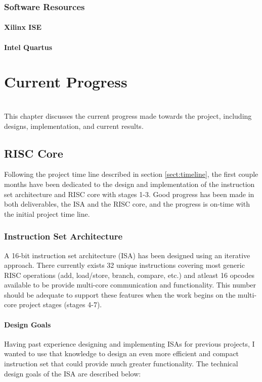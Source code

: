 \documentclass[11pt,a4paper]{report}
\begin{document}
{\subsection{Software Resources}
\subsubsection{Xilinx ISE}
\subsubsection{Intel Quartus}

\chapter{Current Progress}
{%
\startcontents[chapters]
}
\noindent\\
This chapter discusses the current progress made towards the project, including designs, implementation, and current results.

\section{RISC Core}
Following the project time line described in section \ref{sect:timeline}, the first couple months have been dedicated to the design and implementation of the instruction set architecture and RISC core with stages 1-3. Good progress has been made in both deliverables, the ISA and the RISC core, and the progress is on-time with the initial project time line.

\subsection{Instruction Set Architecture}
A 16-bit instruction set architecture (ISA) has been designed using an iterative approach. There currently exists 32 unique instructions covering most generic RISC operations (add, load/store, branch, compare, etc.) and atleast 16 opcodes available to be provide multi-core communication and functionality. This number should be adequate to support these features when the work begins on the multi-core project stages (stages 4-7).

\subsubsection{Design Goals}
Having past experience designing and implementing ISAs for previous projects, I wanted to use that knowledge to design an even more efficient and compact instruction set that could provide much greater functionality. The technical design goals of the ISA are described below:

}
\end{document}
